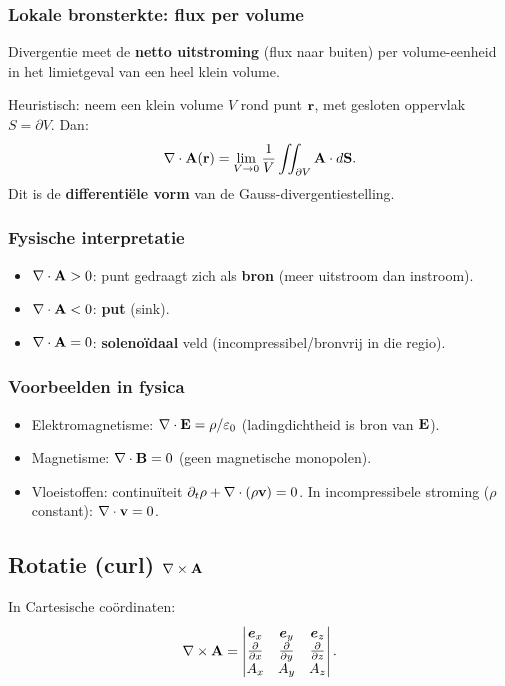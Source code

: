\documentclass[11pt,a4paper]{article}
\begin{document}
    \subsubsection{Lokale bronsterkte: flux per volume}
    Divergentie meet de \textbf{netto uitstroming} (flux naar buiten) per volume-eenheid in het limietgeval van een heel klein volume.

    Heuristisch: neem een klein volume \(V\) rond punt \(\vb{r}\), met gesloten oppervlak \(S=\partial V\). Dan:
    \begin{equation}
        \nabla\cdot\vb{A}(\vb{r}) = \lim_{V\to 0}\frac{1}{V}\iint_{\partial V}\vb{A}\cdot d\vb{S}.
    \end{equation}
    Dit is de \textbf{differenti\"ele vorm} van de Gauss-divergentiestelling.

    \subsubsection{Fysische interpretatie}
    \begin{itemize}
        \item \(\nabla\cdot\vb{A} > 0\): punt gedraagt zich als \textbf{bron} (meer uitstroom dan instroom).
        \item \(\nabla\cdot\vb{A} < 0\): \textbf{put} (sink).
        \item \(\nabla\cdot\vb{A} = 0\): \textbf{soleno\"idaal} veld (incompressibel/bronvrij in die regio).
    \end{itemize}

    \subsubsection{Voorbeelden in fysica}
    \begin{itemize}
        \item Elektromagnetisme: \(\nabla\cdot\vb{E}=\rho/\varepsilon_0\) (ladingdichtheid is bron van \(\vb{E}\)).
        \item Magnetisme: \(\nabla\cdot\vb{B}=0\) (geen magnetische monopolen).
        \item Vloeistoffen: continu\"iteit \(\partial_t\rho+\nabla\cdot(\rho\vb{v})=0\). In incompressibele stroming (\(\rho\) constant): \(\nabla\cdot\vb{v}=0\).
    \end{itemize}


    \subsection{Rotatie (curl) \texorpdfstring{$\nabla\times\vb{A}$}{∇×A}}
    In Cartesische co\"ordinaten:
    \begin{equation}
        \nabla\times\vb{A} =
        \begin{vmatrix}
            \vb*{e}_x & \vb*{e}_y & \vb*{e}_z\\
            \pdv{}{x} & \pdv{}{y} & \pdv{}{z}\\
            A_x & A_y & A_z
        \end{vmatrix}.
    \end{equation}
\end{document}
